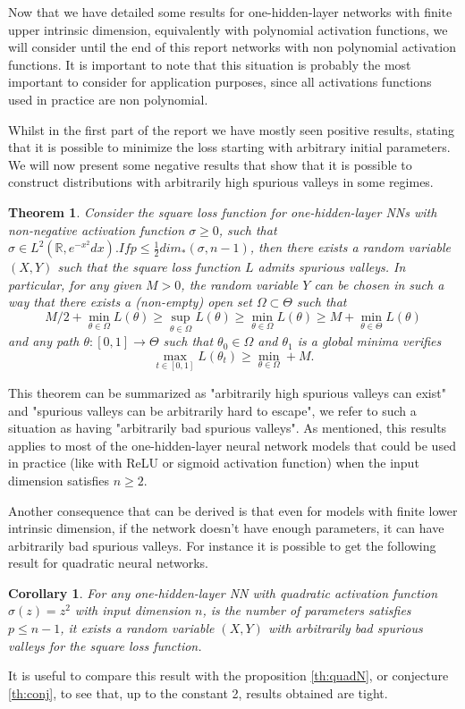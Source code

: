 \documentclass[11pt]{article} %
\newtheorem{theorem}{Theorem}[section]
\newtheorem{corollary}{Corollary}[section]
\begin{document}
Now that we have detailed some results for one-hidden-layer networks with finite upper intrinsic dimension, equivalently with polynomial activation functions, we will consider until the end of this report networks with non polynomial activation functions. It is important to note that this situation is probably the most important to consider for application purposes, since all activations functions used in practice are non polynomial.
\par 
Whilst in the first part of the report we have mostly seen positive results, stating that it is possible to minimize the loss starting with arbitrary initial parameters. We will now present some negative results that show that it is possible to construct distributions with arbitrarily high spurious valleys in some regimes.
\begin{theorem}\label{th:spur}
	Consider the square loss function for one-hidden-layer NNs with non-negative activation function $\sigma\geq 0$, such that $\sigma \in L^2(\mathbb{R}, e^{-x^2}dx). If p \leq \frac{1}{2}dim_*(\sigma, n-1)$, then there exists a random variable $(X,Y)$ such that the square loss function $L$ admits spurious valleys. In particular, for any given $M>0$, the random variable $Y$ can be chosen in such a way that there exists a (non-empty) open set $\Omega\subset \Theta$ such that
\begin{equation}
	M/2 + \min_{\theta\in\Omega} L(\theta) \geq \sup_{\theta\in\Omega} L(\theta) \geq \min_{\theta\in\Omega}L(\theta) \geq M + \min_{\theta\in\Theta}L(\theta)
\end{equation}
and any path $\theta :[0,1]\to \Theta$ such that $\theta_0\in\Omega$ and $\theta_1$ is a global minima verifies
\begin{equation}
	\max_{t\in[0,1]} L(\theta_t) \geq \min_{\theta\in \Omega} + M.
\end{equation}
\end{theorem}
This theorem can be summarized as "arbitrarily high spurious valleys can exist" and "spurious valleys can be arbitrarily hard to escape", we refer to such a situation as having "arbitrarily bad spurious valleys". As mentioned, this results applies to most of the one-hidden-layer neural network models that could be used in practice (like with ReLU or sigmoid activation function) when the input dimension satisfies $n\geq 2$.
\par
Another consequence that can be derived is that even for models with finite lower intrinsic dimension, if the network doesn't have enough parameters, it can have arbitrarily bad spurious valleys. For instance it is possible to get the following result for quadratic neural networks.
\begin{corollary}
	For any one-hidden-layer NN with quadratic activation function $\sigma(z)=z^2$ with input dimension $n$, is the number of parameters satisfies $p\leq n-1$, it exists a random variable $(X,Y)$ with arbitrarily bad spurious valleys for the square loss function.
\end{corollary}
It is useful to compare this result with the proposition \ref{th:quadN}, or conjecture \ref{th:conj}, to see that, up to the constant 2, results obtained are tight.
\end{document}
